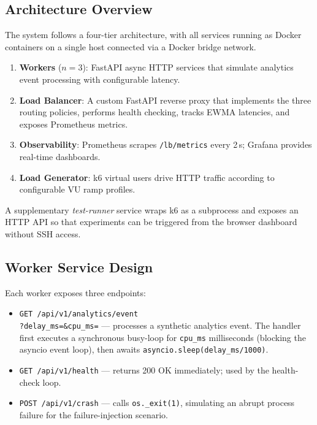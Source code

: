 \documentclass[conference]{IEEEtran}
\begin{document}
\subsection{Architecture Overview}

The system follows a four-tier architecture, with all services running
as Docker containers on a single host connected via a Docker bridge
network.

\begin{enumerate}
    \item \textbf{Workers} ($n=3$): FastAPI async HTTP services that
    simulate analytics event processing with configurable latency.
    \item \textbf{Load Balancer}: A custom FastAPI reverse proxy that
    implements the three routing policies, performs health checking,
    tracks EWMA latencies, and exposes Prometheus metrics.
    \item \textbf{Observability}: Prometheus scrapes
    \texttt{/lb/metrics} every 2\,s; Grafana provides real-time dashboards.
    \item \textbf{Load Generator}: k6 virtual users drive HTTP traffic
    according to configurable VU ramp profiles.
\end{enumerate}

A supplementary \emph{test-runner} service wraps k6 as a subprocess and
exposes an HTTP API so that experiments can be triggered from the
browser dashboard without SSH access.

\subsection{Worker Service Design}

Each worker exposes three endpoints:
\begin{itemize}
    \item \texttt{GET /api/v1/analytics/event}\\\texttt{?delay\_ms=\&cpu\_ms=} ---
    processes a synthetic analytics event. The handler first executes a
    synchronous busy-loop for \texttt{cpu\_ms} milliseconds (blocking the
    asyncio event loop), then awaits \texttt{asyncio.sleep(delay\_ms/1000)}.
    \item \texttt{GET /api/v1/health} --- returns 200 OK immediately;
    used by the health-check loop.
    \item \texttt{POST /api/v1/crash} --- calls \texttt{os.\_exit(1)},
    simulating an abrupt process failure for the failure-injection scenario.
\end{itemize}
\end{document}
